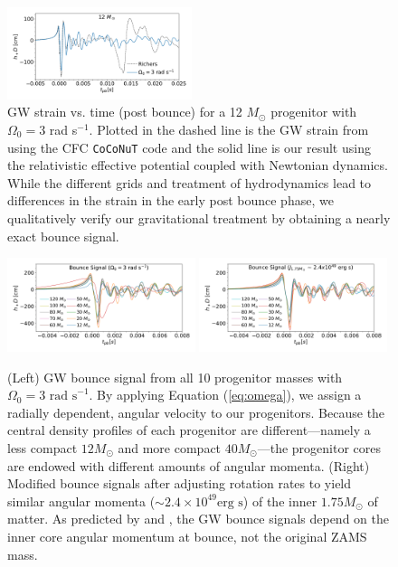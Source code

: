 \documentclass[twocolumn,times]{aastex62}  %
\begin{document}
 \begin{figure}[t]
    \centering
    \includegraphics[width=0.48\textwidth]{figures/bounce_richers.pdf}
    \caption{GW strain vs. time (post bounce) for a 12 \(M_\odot\) progenitor with $\Omega_0 = 3$ rad s$^{-1}$.  Plotted in the dashed line is the GW strain from \citet{richers:2017} using the CFC \texttt{CoCoNuT} code and the solid line is our result using the relativistic effective potential coupled with Newtonian dynamics.  While the different grids and treatment of hydrodynamics lead to differences in the strain in the early post bounce phase, we qualitatively verify our gravitational treatment by obtaining a nearly exact bounce signal. }
    \label{fig:bounce_cfc}
\end{figure}

\begin{figure}[t]
  \centering     %
  \includegraphics[width=0.49\textwidth]{figures/hd3_bounce_test.pdf}
  \includegraphics[width=0.49\textwidth]{figures/hdj_bounce_final.pdf}
  \caption{(Left) GW bounce signal from all 10 progenitor masses with $\Omega_0 = 3 \text{ rad s}^{-1}$.  By applying Equation (\ref{eq:omega}), we assign a radially dependent, angular velocity to our progenitors.  Because the central density profiles of each progenitor are different---namely a less compact $12 M_\odot$ and more compact $40 M_\odot$---the progenitor cores are endowed with different amounts of angular momenta.   (Right) Modified bounce signals after adjusting rotation rates to yield similar angular momenta ($\sim 2.4\times10^{49} \text{erg s}$) of the inner $1.75 M_\odot$ of matter.  As predicted by \citet{dimm:2008} and \citet{abdik:2010,abdik:2014}, the GW bounce signals depend on the inner core angular momentum at bounce, not the original ZAMS mass.}
  \label{fig:bounce}
\end{figure}
\end{document}
